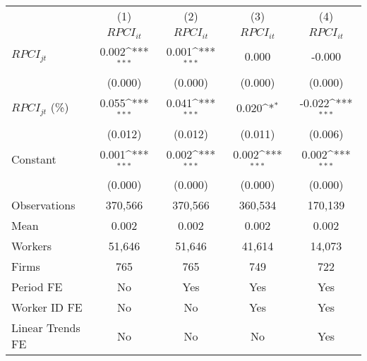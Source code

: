 {
\def\sym#1{\ifmmode^{#1}\else\(^{#1}\)\fi}
\begin{tabular}{l*{4}{c}}
\hline\hline
                    &\multicolumn{1}{c}{(1)}&\multicolumn{1}{c}{(2)}&\multicolumn{1}{c}{(3)}&\multicolumn{1}{c}{(4)}\\
                    &\multicolumn{1}{c}{$RPCI_{it}$}&\multicolumn{1}{c}{$RPCI_{it}$}&\multicolumn{1}{c}{$RPCI_{it}$}&\multicolumn{1}{c}{$RPCI_{it}$}\\
\hline
$RPCI_{jt}$         &       0.002\sym{***}&       0.001\sym{***}&       0.000         &      -0.000         \\
                    &     (0.000)         &     (0.000)         &     (0.000)         &     (0.000)         \\
[1em]
$RPCI_{jt}$ (\%)    &       0.055\sym{***}&       0.041\sym{***}&       0.020\sym{*}  &      -0.022\sym{***}\\
                    &     (0.012)         &     (0.012)         &     (0.011)         &     (0.006)         \\
[1em]
Constant            &       0.001\sym{***}&       0.002\sym{***}&       0.002\sym{***}&       0.002\sym{***}\\
                    &     (0.000)         &     (0.000)         &     (0.000)         &     (0.000)         \\
\hline
Observations        &     370,566         &     370,566         &     360,534         &     170,139         \\
Mean                &       0.002         &       0.002         &       0.002         &       0.002         \\
Workers             &      51,646         &      51,646         &      41,614         &      14,073         \\
Firms               &         765         &         765         &         749         &         722         \\
Period FE           &          No         &         Yes         &         Yes         &         Yes         \\
Worker ID FE        &          No         &          No         &         Yes         &         Yes         \\
Linear Trends FE    &          No         &          No         &          No         &         Yes         \\
\hline\hline
\end{tabular}
}
